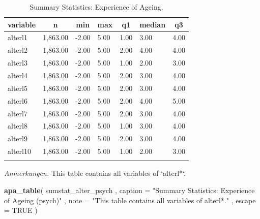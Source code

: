 \documentclass[
  doc]{apa6}
\newenvironment{Shaded}{\begin{snugshade}}{\end{snugshade}}
\newcommand{\AttributeTok}[1]{\textcolor[rgb]{0.13,0.29,0.53}{#1}}
\newcommand{\ConstantTok}[1]{\textcolor[rgb]{0.56,0.35,0.01}{#1}}
\newcommand{\FunctionTok}[1]{\textcolor[rgb]{0.13,0.29,0.53}{\textbf{#1}}}
\newcommand{\NormalTok}[1]{#1}
\newcommand{\StringTok}[1]{\textcolor[rgb]{0.31,0.60,0.02}{#1}}
\begin{document}
\begin{table}[tbp]

\begin{center}
\begin{threeparttable}

\caption{\label{tab:tabrstatix}Summary Statistics: Experience of Ageing.}

\begin{tabular}{lllllll}
\toprule
variable & \multicolumn{1}{c}{n} & \multicolumn{1}{c}{min} & \multicolumn{1}{c}{max} & \multicolumn{1}{c}{q1} & \multicolumn{1}{c}{median} & \multicolumn{1}{c}{q3}\\
\midrule
alterl1 & 1,863.00 & -2.00 & 5.00 & 1.00 & 3.00 & 4.00\\
alterl2 & 1,863.00 & -2.00 & 5.00 & 2.00 & 4.00 & 4.00\\
alterl3 & 1,863.00 & -2.00 & 5.00 & 1.00 & 2.00 & 3.00\\
alterl4 & 1,863.00 & -2.00 & 5.00 & 2.00 & 3.00 & 4.00\\
alterl5 & 1,863.00 & -2.00 & 5.00 & 2.00 & 3.00 & 4.00\\
alterl6 & 1,863.00 & -2.00 & 5.00 & 2.00 & 4.00 & 5.00\\
alterl7 & 1,863.00 & -2.00 & 5.00 & 2.00 & 3.00 & 4.00\\
alterl8 & 1,863.00 & -2.00 & 5.00 & 1.00 & 3.00 & 4.00\\
alterl9 & 1,863.00 & -2.00 & 5.00 & 2.00 & 3.00 & 4.00\\
alterl10 & 1,863.00 & -2.00 & 5.00 & 1.00 & 2.00 & 3.00\\
\bottomrule
\addlinespace
\end{tabular}

\begin{tablenotes}[para]
\normalsize{\textit{Anmerkungen.} This table contains all variables of `alterl*`.}
\end{tablenotes}

\end{threeparttable}
\end{center}

\end{table}

\begin{Shaded}
\begin{Highlighting}[]
\FunctionTok{apa\_table}\NormalTok{(}
\NormalTok{  sumstat\_alter\_psych}
\NormalTok{  , }\AttributeTok{caption =} \StringTok{"Summary Statistics: Experience of Ageing (psych)"}
\NormalTok{  , }\AttributeTok{note =} \StringTok{"This table contains all variables of \textasciigrave{}alterl*\textasciigrave{}."}
\NormalTok{  , }\AttributeTok{escape =} \ConstantTok{TRUE}
\NormalTok{)}
\end{Highlighting}
\end{Shaded}
\end{document}
